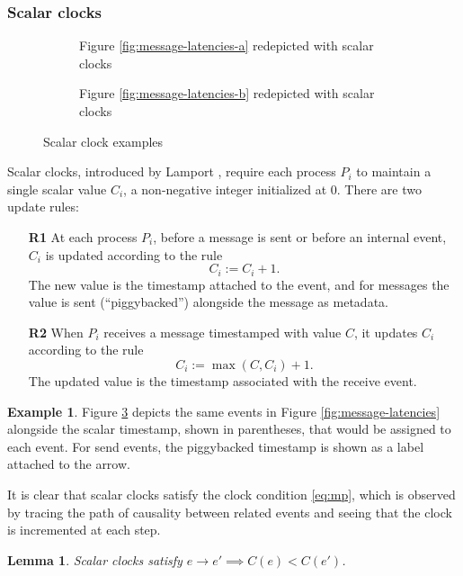 \documentclass[]             %
{NASA}                       %
\newtheorem{lemma}[theorem]{Lemma}
\theoremstyle{definition}
\newtheorem{example}{Example}[section]
\begin{document}
\subsubsection{Scalar clocks}
\label{sssec:scalar-clocks}
\begin{figure}
  \setlength\belowcaptionskip{5ex}

  \begin{subfigure}{1\textwidth}
    \centering 
    \caption{Figure \ref{fig:message-latencies-a} redepicted with scalar clocks}
    \label{fig:message-latencies-scalar-a}
  \end{subfigure}

  \begin{subfigure}{1\textwidth}
    \centering 
    \caption{Figure \ref{fig:message-latencies-b} redepicted with scalar clocks}
    \label{fig:message-latencies-scalar-b}
  \end{subfigure}

  \caption{Scalar clock examples}
  \label{fig:message-latencies-scalar}
\end{figure}

Scalar clocks, introduced by Lamport \cite{1978:lamportclocks},
require each process $P_i$ to maintain a single scalar value $C_i$, a
non-negative integer initialized at $0$. There are two update rules:
\begin{enumerate}
\item[\textbf{R1}] At each process $P_i$, before a message is sent or
  before an internal event, $C_i$ is updated according to the rule
  \[C_i := C_i + 1.\] The new value is the timestamp attached to the
  event, and for messages the value is sent (``piggybacked'')
  alongside the message as metadata.
\item[\textbf{R2}] When $P_i$ receives a message timestamped with value $C$, it
  updates $C_i$ according to the rule
  \[C_i := \max(C, C_i) + 1.\]
  The updated value is the timestamp associated with the receive
  event.
\end{enumerate}

\begin{example}
Figure \ref{fig:message-latencies-scalar} depicts the same events in
Figure \ref{fig:message-latencies} alongside the scalar timestamp,
shown in parentheses, that would be assigned to each event. For send
events, the piggybacked timestamp is shown as a label attached to the
arrow.
\end{example}

It is clear that scalar clocks satisfy the clock condition
\eqref{eq:mp}, which is observed by tracing the path of causality
between related events and seeing that the clock is incremented at
each step.
\begin{lemma}
  Scalar clocks satisfy $e \to e' \implies C(e) < C(e')$.
\end{lemma}
\end{document}
